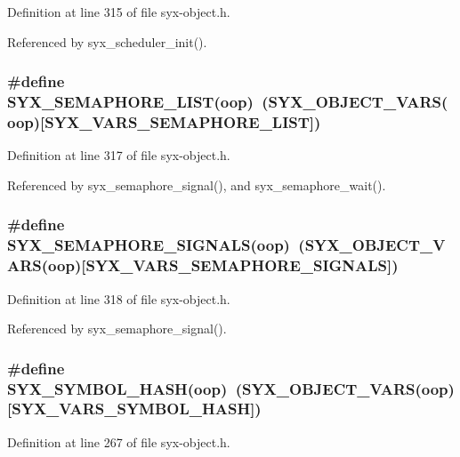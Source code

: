Definition at line 315 of file syx-object.h.

Referenced by syx\_\-scheduler\_\-init().\hypertarget{syx-object_8h_f602bbb62e7ca09615625e04b4f5610c}{
\subsubsection{\setlength{\rightskip}{0pt plus 5cm}\#define SYX\_\-SEMAPHORE\_\-LIST(oop)~(SYX\_\-OBJECT\_\-VARS(oop)\mbox{[}SYX\_\-VARS\_\-SEMAPHORE\_\-LIST\mbox{]})}}
\label{syx-object_8h_f602bbb62e7ca09615625e04b4f5610c}




Definition at line 317 of file syx-object.h.

Referenced by syx\_\-semaphore\_\-signal(), and syx\_\-semaphore\_\-wait().\hypertarget{syx-object_8h_7d7dca42d785621efdcdcd1c239d6013}{
\subsubsection{\setlength{\rightskip}{0pt plus 5cm}\#define SYX\_\-SEMAPHORE\_\-SIGNALS(oop)~(SYX\_\-OBJECT\_\-VARS(oop)\mbox{[}SYX\_\-VARS\_\-SEMAPHORE\_\-SIGNALS\mbox{]})}}
\label{syx-object_8h_7d7dca42d785621efdcdcd1c239d6013}




Definition at line 318 of file syx-object.h.

Referenced by syx\_\-semaphore\_\-signal().\hypertarget{syx-object_8h_e536b120cd5e071ff38023aa29045768}{
\subsubsection{\setlength{\rightskip}{0pt plus 5cm}\#define SYX\_\-SYMBOL\_\-HASH(oop)~(SYX\_\-OBJECT\_\-VARS(oop)\mbox{[}SYX\_\-VARS\_\-SYMBOL\_\-HASH\mbox{]})}}
\label{syx-object_8h_e536b120cd5e071ff38023aa29045768}




Definition at line 267 of file syx-object.h.

